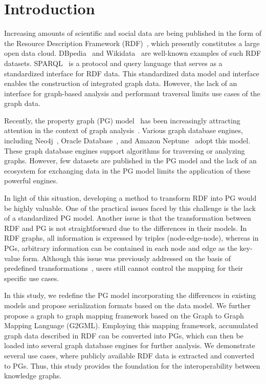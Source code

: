 \documentclass[runningheads]{llncs}
\begin{document}
\section{Introduction}

Increasing amounts of scientific and social data are being published in the form of the Resource Description Framework (RDF)~\cite{rdf}, which presently constitutes a large open data cloud. DBpedia~\cite{dbpedia} and Wikidata~\cite{wikidata} are well-known examples of such RDF datasets. SPARQL~\cite{sparql} is a protocol and query language that serves as a standardized interface for RDF data. This standardized data model and interface enables the construction of integrated graph data. However, the lack of an interface for graph-based analysis and performant traversal limits use cases of the graph data.

Recently, the property graph (PG) model~\cite{angles1,angles2} has been increasingly attracting attention in the context of graph analysis~\cite{agri}. Various graph database engines, including Neo4j~\cite{neo4j}, Oracle Database~\cite{oracle}, and Amazon Neptune~\cite{neptune} adopt this model. These graph database engines support algorithms for traversing or analyzing graphs. However, few datasets are published in the PG model and the lack of an ecosystem for exchanging data in the PG model limits the application of these powerful engines.

In light of this situation, developing a method to transform RDF into PG would be highly valuable. One of the practical issues faced by this challenge is the lack of a standardized PG model.
Another issue is that the transformation between RDF and PG is not straightforward due to the differences in their models. 
In RDF graphs, all information is expressed by triples (node-edge-node), whereas in PGs, arbitrary information can be contained in each node and edge as the key-value form. 
Although this issue was previously addressed on the basis of predefined transformations~\cite{hartig},
users still cannot control the mapping for their specific use cases.

In this study, we redefine the PG model incorporating the differences in existing models and propose serialization formats based on the data model. We further propose a graph to graph mapping framework based on the Graph to Graph Mapping Language (G2GML). Employing this mapping framework, accumulated graph data described in RDF can be converted into PGs, which can then be loaded into several graph database engines for further analysis. We demonstrate several use cases, where publicly available RDF data is extracted and converted to PGs. Thus, this study provides the foundation for the interoperability between knowledge graphs.
\end{document}
